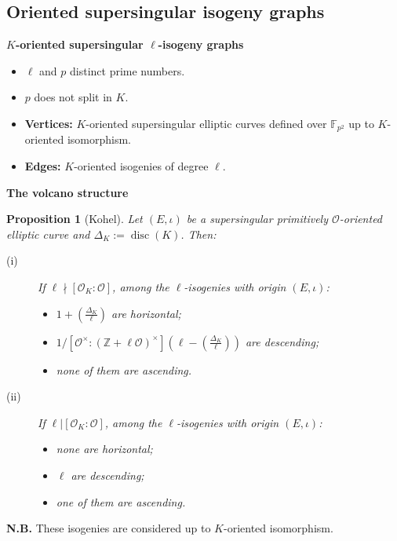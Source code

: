 \documentclass[10pt]{beamer}
\theoremstyle{plain}
\newtheorem{proposition}{Proposition}
\theoremstyle{definition}
\newcommand{\Z}{\mathbb{Z}}
\newcommand{\F}{\mathbb{F}}
\newcommand{\mO}{\mathcal{O}}
\renewcommand{\(}{\left(}
\renewcommand{\)}{\right)}
\DeclareMathOperator{\disc}{disc}
\begin{document}
\subsection{Oriented supersingular isogeny graphs}

\begin{frame}
\textbf{$K$-oriented supersingular $\ell$-isogeny graphs}
\vspace{0.5cm}
\begin{itemize}
\item $\ell$ and $p$ distinct prime numbers.
\item $p$ does not split in $K$.
\item \textbf{Vertices:} $K$-oriented supersingular elliptic curves defined over $\F_{p^2}$ up to $K$-oriented isomorphism.
\item \textbf{Edges:} $K$-oriented isogenies of degree $\ell$.
\end{itemize}

\end{frame}

\begin{frame}

\textbf{The volcano structure}

\vspace{0.5cm}

\begin{proposition}[Kohel]
Let $(E,\iota)$ be a supersingular primitively $\mO$-oriented elliptic curve and $\Delta_K:=\disc(K)$. Then:

\begin{description}
\item[(i)] If $\ell\nmid [\mO_K:\mO]$, among the $\ell$-isogenies with origin $(E,\iota)$:
\begin{itemize}
\item $1+\(\frac{\Delta_K}{\ell}\)$ are horizontal;
\item $1/[\mO^\times:(\Z+\ell\mO)^\times]\(\ell-\(\frac{\Delta_K}{\ell}\)\)$ are descending;
\item none of them are ascending.
\end{itemize}

\item[(ii)] If $\ell|[\mO_K:\mO]$, among the $\ell$-isogenies with origin $(E,\iota)$:
\begin{itemize}
\item none are horizontal;
\item $\ell$ are descending;
\item one of them are ascending.
\end{itemize}
\end{description}
\end{proposition}

\textbf{N.B.} These isogenies are considered up to $K$-oriented isomorphism.

\end{frame}
\end{document}
